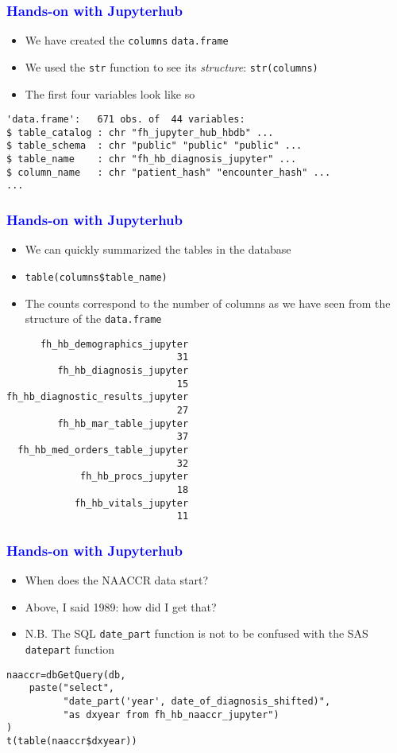 \documentclass[11pt,pdftex,dvipsnames,usenames]{beamer}
\begin{document}
\begin{frame}[fragile]\frametitle{\bf\textcolor{blue}{Hands-on with Jupyterhub}}
\begin{itemize}
\item We have created the \texttt{columns} \texttt{data.frame}
\item We used the \texttt{str} function to see its {\it structure}: \texttt{str(columns)}
\item The first four variables look like so
\end{itemize}
\begin{verbatim}
'data.frame':	671 obs. of  44 variables:
$ table_catalog : chr "fh_jupyter_hub_hbdb" ...
$ table_schema  : chr "public" "public" "public" ...
$ table_name    : chr "fh_hb_diagnosis_jupyter" ...
$ column_name   : chr "patient_hash" "encounter_hash" ...
...
\end{verbatim}
\end{frame}

\begin{frame}[fragile]\frametitle{\bf\textcolor{blue}{Hands-on with Jupyterhub}}
\begin{itemize}
\item We can quickly summarized the tables in the database
\item \texttt{table(columns\$table\_name)}
\item The counts correspond to the number of columns as we have seen from the structure of the \texttt{data.frame}
\end{itemize}
\begin{verbatim}
      fh_hb_demographics_jupyter          
                              31
         fh_hb_diagnosis_jupyter 
                              15 
fh_hb_diagnostic_results_jupyter
                              27
         fh_hb_mar_table_jupyter
                              37
  fh_hb_med_orders_table_jupyter 
                              32 
             fh_hb_procs_jupyter
                              18 
            fh_hb_vitals_jupyter 
                              11 
\end{verbatim}
\end{frame}

\begin{frame}[fragile]\frametitle{\bf\textcolor{blue}{Hands-on with Jupyterhub}}
\begin{itemize}
\item When does the NAACCR data start?
\item Above, I said 1989: how did I get that?
\item N.B. The SQL \texttt{date\_part} function is not to be confused with 
the SAS \texttt{datepart} function
\end{itemize}
\begin{verbatim}
naaccr=dbGetQuery(db, 
    paste("select",
          "date_part('year', date_of_diagnosis_shifted)",
          "as dxyear from fh_hb_naaccr_jupyter")
)
t(table(naaccr$dxyear))
\end{verbatim}
\end{frame}
\end{document}
